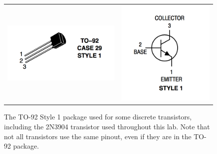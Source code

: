 \documentclass[12pt]{article}
\begin{document}
\begin{figure}[htbp]
\begin{center}
\begin{tabular}{c@{\hskip 2cm}c}
\includegraphics[height=0.10\textheight]{figs/case3904.png} &
\includegraphics[height=0.18\textheight]{figs/chan3904.png} \\
\end{tabular}
\end{center}
\caption{The TO-92 Style 1 package used for some discrete transistors, including the 2N3904 transistor used throughout this lab.  Note that not all transistors use the same pinout, even if they are in the TO-92 package.}
\label{fig:layout}
\end{figure}
\end{document}
